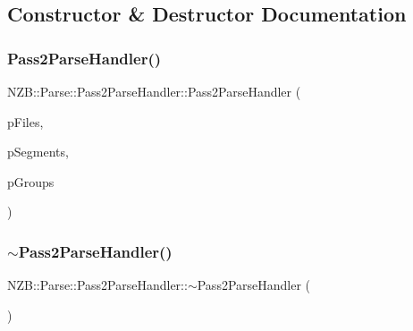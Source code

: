 \subsection{Constructor \& Destructor Documentation}
\hypertarget{class_n_z_b_1_1_parse_1_1_pass2_parse_handler_a04b11c88f54b2804e13043c5cd57e0d7}{}\label{class_n_z_b_1_1_parse_1_1_pass2_parse_handler_a04b11c88f54b2804e13043c5cd57e0d7} 
\subsubsection{\texorpdfstring{Pass2\+Parse\+Handler()}{Pass2ParseHandler()}}
{\footnotesize\ttfamily N\+Z\+B\+::\+Parse\+::\+Pass2\+Parse\+Handler\+::\+Pass2\+Parse\+Handler (\begin{DoxyParamCaption}\item[{\hyperlink{class_n_z_b_1_1_file}{N\+Z\+B\+::\+File} $\ast$}]{p\+Files,  }\item[{\hyperlink{class_n_z_b_1_1_segment}{N\+Z\+B\+::\+Segment} $\ast$}]{p\+Segments,  }\item[{\hyperlink{class_n_z_b_1_1_group}{N\+Z\+B\+::\+Group} $\ast$}]{p\+Groups }\end{DoxyParamCaption})}

\hypertarget{class_n_z_b_1_1_parse_1_1_pass2_parse_handler_aeda10efa356a2b6ef318a37684206f6c}{}\label{class_n_z_b_1_1_parse_1_1_pass2_parse_handler_aeda10efa356a2b6ef318a37684206f6c} 
\subsubsection{\texorpdfstring{$\sim$\+Pass2\+Parse\+Handler()}{~Pass2ParseHandler()}}
{\footnotesize\ttfamily N\+Z\+B\+::\+Parse\+::\+Pass2\+Parse\+Handler\+::$\sim$\+Pass2\+Parse\+Handler (\begin{DoxyParamCaption}{ }\end{DoxyParamCaption})\hspace{0.3cm}{\ttfamily [inline]}}



